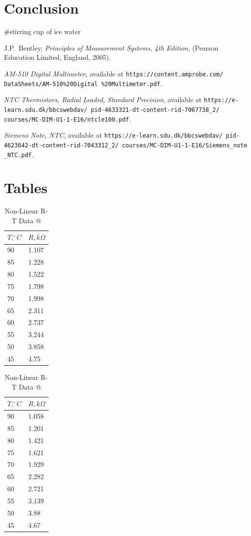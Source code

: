 \documentclass[a4,11pt]{article}
\makeatletter
\newcommand*{\rom}[1]{\expandafter\@slowromancap\romannumeral #1@}
\makeatother
\begin{document}
\section{Conclusion}
\#stirring cup of ice water
\begin{thebibliography}{99}
	J.P.\ Bentley, \textit{Principles of Measurement Systems, 4th Edition},
	(Pearson Education Limited, England, 2005).
	
	 \emph{AM-510 Digital Multimeter},   available at
	\texttt{https://content.amprobe.com/
		DataSheets/AM-510\%20Digital
		\%20Multimeter.pdf}.	
	
	 \emph{NTC Thermistors, Radial Leaded, Standard Precision},   available at
	\texttt{https://e-learn.sdu.dk/bbcswebdav/
		pid-4633321-dt-content-rid-7067738\_2/
		courses/MC-DIM-U1-1-E16/ntcle100.pdf}.
	
	 \emph{Siemens Note, NTC},   available at
	\texttt{https://e-learn.sdu.dk/bbcswebdav/
		pid-4623642-dt-content-rid-7043312\_2/
		courses/MC-DIM-U1-1-E16/Siemens\_note
		\_NTC.pdf}.
\end{thebibliography}
\appendix
\section{Tables}
\begin{table}[H]
	\centering
	\caption{Non-Linear R-T Data \rom{1}}
	\begin{tabular}{l|l}
		\hline
		$T, ^{\circ}C$ & $R, k\Omega$ \\
		\hline
		90 & 1.107  \\
		85 & 1.228  \\
		80 & 1.522  \\
		75 & 1.798  \\
		70 & 1.998  \\
		65 & 2.311  \\
		60 & 2.737  \\
		55 & 3.244  \\
		50 & 3.858  \\
		45 & 4.75  \\
		\hline
	\end{tabular}
\end{table}

\begin{table}[H]
	\centering
	\caption{Non-Linear R-T Data \rom{2}}
	\begin{tabular}{l|l}
		\hline
		$T, ^{\circ}C$ & $R, k\Omega$ \\
		\hline
		90 & 1.058  \\
		85 & 1.201  \\
		80 & 1.421  \\
		75 & 1.621  \\
		70 & 1.929  \\
		65 & 2.282  \\
		60 & 2.721  \\
		55 & 3.139  \\
		50 & 3.88  \\
		45 & 4.67  \\
	\end{tabular}
\end{table}
\end{document}
